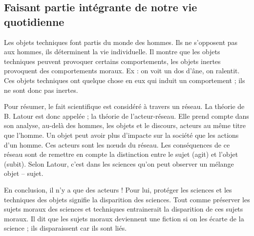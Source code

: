 \documentclass[11pt,a4paper]{article} %
\begin{document}
\subsection{Faisant partie intégrante de notre vie quotidienne}
Les objets techniques font partis du monde des hommes.
Ils ne s'opposent pas aux hommes, ils déterminent la vie individuelle.
Il montre que les objets techniques peuvent provoquer certains comportements, les objets inertes provoquent des comportements moraux.
Ex : on voit un dos d'âne, on ralentit.
Ces objets techniques ont quelque chose en eux qui induit un comportement ; ils ne sont donc pas inertes.

Pour résumer, le fait scientifique est considéré à travers un réseau.
La théorie de B.
Latour est donc appelée ;  la théorie de l'acteur-réseau.
Elle prend compte dans son analyse, au-delà des hommes, les objets et le discours, acteurs au même titre que l'homme.
Un objet peut avoir plus d'impacte sur la société que les actions d'un homme.
Ces acteurs sont les nœuds du réseau.
Les conséquences de ce réseau sont de remettre en compte la distinction entre le sujet (agit) et l'objet (subit).
Selon Latour, c'est dans les sciences qu'on peut observer un mélange objet – sujet.

En conclusion, il n'y a que des acteurs ! Pour lui, protéger les sciences et les techniques des objets signifie la disparition des sciences.
Tout comme préserver les sujets moraux des sciences et techniques entrainerait la disparition de ces sujets moraux.
Il dit que les sujets moraux deviennent une fiction si on les écarte de la science ; ils disparaissent car ils sont liés.
\end{document}
